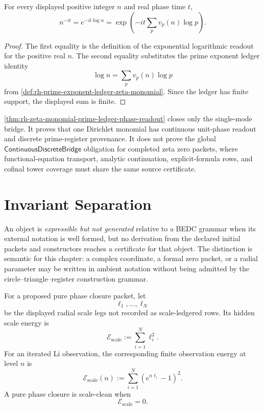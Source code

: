 \begin{theorem}
\label{thm:rh-zeta-monomial-prime-ledger-phase-readout}
For every displayed positive integer $n$ and real phase time $t$,
$$
n^{-it}
=
e^{-it\log n}
=
\exp\left(
-it\sum_p v_p(n)\log p
\right).
$$
\end{theorem}

\begin{proof}
The first equality is the definition of the exponential logarithmic
readout for the positive real $n$. The second equality substitutes the
prime exponent ledger identity
$$
\log n=\sum_p v_p(n)\log p
$$
from \autoref{def:rh-prime-exponent-ledger-zeta-monomial}. Since the
ledger has finite support, the displayed sum is finite.
\end{proof}

\begin{principle}
\label{prin:rh-single-mode-bridge-status}
\autoref{thm:rh-zeta-monomial-prime-ledger-phase-readout} closes only the
single-mode bridge. It proves that one Dirichlet monomial has continuous
unit-phase readout and discrete prime-register provenance. It does not
prove the global
$\mathsf{ContinuousDiscreteBridge}$ obligation for completed zeta zero
packets, where functional-equation transport, analytic continuation,
explicit-formula rows, and cofinal tower coverage must share the same
source certificate.
\end{principle}

\section{Invariant Separation}
\label{sec:rh-radial-invariant-separation}

\begin{definition}
\label{def:rh-expressible-not-generated}
An object is \emph{expressible but not generated} relative to a BEDC
grammar when its external notation is well formed, but no derivation from
the declared initial packets and constructors reaches a certificate for
that object. The distinction is semantic for this chapter: a complex
coordinate, a formal zero packet, or a radial parameter may be written in
ambient notation without being admitted by the circle--triangle--register
construction grammar.
\end{definition}

\begin{definition}
\label{def:rh-hidden-scale-energy}
For a proposed pure phase closure packet, let
$$
\ell_1,\ldots,\ell_N
$$
be the displayed radial scale legs not recorded as scale-ledgered rows.
Its hidden scale energy is
$$
\mathcal E_{\mathrm{scale}}
:=
\sum_{i=1}^{N}\ell_i^2.
$$
For an iterated Li observation, the corresponding finite observation
energy at level $n$ is
$$
\mathcal E_{\mathrm{scale}}(n)
:=
\sum_{i=1}^{N}(e^{n\ell_i}-1)^2.
$$
A pure phase closure is scale-clean when
$$
\mathcal E_{\mathrm{scale}}=0.
$$
\end{definition}

